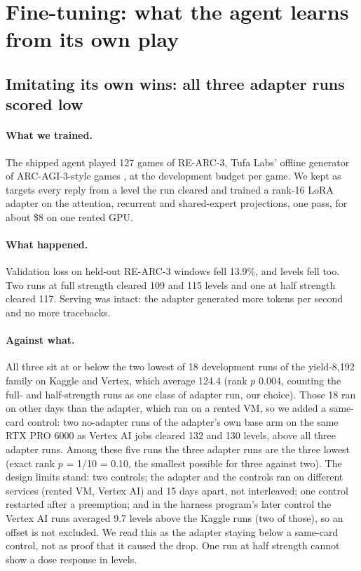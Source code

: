 \section{Fine-tuning: what the agent learns from its own play}\label{sec:finetune}

\subsection{Imitating its own wins: all three adapter runs scored low}\label{sec:rft}

\paragraph{What we trained.}
The shipped agent played 127 games of RE-ARC-3, Tufa Labs' offline generator of ARC-AGI-3-style games \citep{tufalabs2026rearc3}, at the development budget per game. %
We kept as targets every reply from a level the run cleared and trained a rank-16 LoRA adapter \citep{hu2022lora} on the attention, recurrent and shared-expert projections, one pass, for about \$8 on one rented GPU. %

\paragraph{What happened.}
Validation loss on held-out RE-ARC-3 windows fell 13.9\%, and levels fell too. %
Two runs at full strength cleared 109 and 115 levels and one at half strength cleared 117. %
Serving was intact: the adapter generated more tokens per second and no more tracebacks. %

\paragraph{Against what.}
All three sit at or below the two lowest of 18 development runs of the yield-8,192 family on Kaggle and Vertex, which average 124.4 (rank $p$ 0.004, counting the full- and half-strength runs as one class of adapter run, our choice). %
Those 18 ran on other days than the adapter, which ran on a rented VM, so we added a same-card control: two no-adapter runs of the adapter's own base arm on the same RTX PRO 6000 as Vertex AI jobs cleared 132 and 130 levels, above all three adapter runs. %
Among these five runs the three adapter runs are the three lowest (exact rank $p$ = 1/10 = 0.10, the smallest possible for three against two). %
The design limits stand: two controls; the adapter and the controls ran on different services (rented VM, Vertex AI) and 15 days apart, not interleaved; one control restarted after a preemption; and in the harness program's later control the Vertex AI runs averaged 9.7 levels above the Kaggle runs (two of those), so an offset is not excluded. %
We read this as the adapter staying below a same-card control, not as proof that it caused the drop.
One run at half strength cannot show a dose response in levels.

